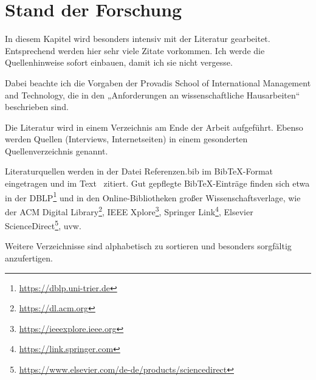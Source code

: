 %

\chapter{Stand der Forschung}

In diesem Kapitel wird besonders intensiv mit der Literatur gearbeitet. Entsprechend werden hier sehr viele Zitate vorkommen. Ich werde die Quellenhinweise sofort einbauen, damit ich sie nicht vergesse.

Dabei beachte ich die Vorgaben der Provadis School of International Management and Technology, die in den „Anforderungen an wissenschaftliche Hausarbeiten“ beschrieben sind.

Die Literatur wird in einem Verzeichnis am Ende der Arbeit aufgeführt.
Ebenso werden Quellen (Interviews, Internetseiten) in einem gesonderten Quellenverzeichnis genannt.

Literaturquellen werden in der Datei Referenzen.bib im BibTeX-Format eingetragen und im Text~\autocite[Vgl.][67]{kaffeetrinker2026} zitiert.
Gut gepflegte BibTeX-Einträge finden sich etwa in der DBLP\footnote{\url{https://dblp.uni-trier.de}} und in den Online-Bibliotheken großer Wissenschaftsverlage, wie der ACM Digital Library\footnote{\url{https://dl.acm.org}}, IEEE Xplore\footnote{\url{https://ieeexplore.ieee.org}}, Springer Link\footnote{\url{https://link.springer.com}}, Elsevier ScienceDirect\footnote{\url{https://www.elsevier.com/de-de/products/sciencedirect}}, uvw.

Weitere Verzeichnisse sind alphabetisch zu sortieren und besonders sorgfältig anzufertigen.
